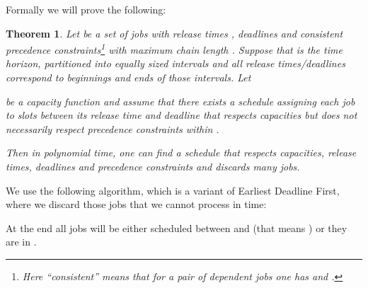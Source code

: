 \documentclass[11pt,letterpaper,oneside,english]{article}
\theoremstyle{theorem}
\newtheorem{theorem}{Theorem}
\begin{document}
Formally we will prove the following:
\begin{theorem}\label{thm:EDF}
Let  be a set of jobs with release times , deadlines  and consistent
precedence constraints\footnote{Here ``consistent'' means that 
for a pair of dependent jobs  one has  and .} with maximum chain length .
Suppose that  is the time horizon, partitioned into
equally sized intervals 
and all release times/deadlines correspond to beginnings and ends of
those intervals. Let

be a capacity function and assume that there exists a 
schedule  assigning each job to slots between its release time and deadline that respects
capacities but does not necessarily respect precedence constraints within .


Then in polynomial time, one can find a schedule  that respects
capacities, release times, deadlines and precedence
constraints and discards   many jobs.
\end{theorem}

We use the following algorithm, which is a variant of Earliest Deadline First, where we
discard those jobs that we cannot process in time:
\begin{center}
\end{center}
At the end all jobs  will be either scheduled between  and 
(that means ) or they are
in .
\end{document}
